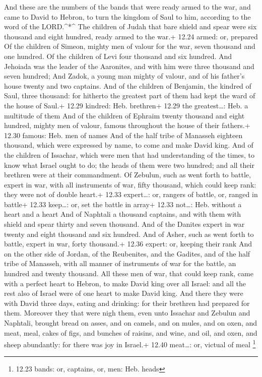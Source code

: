  And these are the numbers of the bands that were ready
armed to the war, and came to David to Hebron, to turn the kingdom of
Saul to him, according to the word of the LORD.\^{}*\^{} 
The children of Judah that bare shield and spear were six thousand and
eight hundred, ready armed to the war.+ 12.24 armed: or, prepared
 Of the children of Simeon, mighty men of valour for the
war, seven thousand and one hundred.  Of the children of
Levi four thousand and six hundred.  And Jehoiada was the
leader of the Aaronites, and with him were three thousand and seven
hundred;  And Zadok, a young man mighty of valour, and of
his father's house twenty and two captains.  And of the
children of Benjamin, the kindred of Saul, three thousand: for hitherto
the greatest part of them had kept the ward of the house of Saul.+ 12.29
kindred: Heb. brethren+ 12.29 the greatest\ldots: Heb. a multitude of
them  And of the children of Ephraim twenty thousand and
eight hundred, mighty men of valour, famous throughout the house of
their fathers.+ 12.30 famous: Heb. men of names  And of the
half tribe of Manasseh eighteen thousand, which were expressed by name,
to come and make David king.  And of the children of
Issachar, which were men that had understanding of the times, to know
what Israel ought to do; the heads of them were two hundred; and all
their brethren were at their commandment.  Of Zebulun, such
as went forth to battle, expert in war, with all instruments of war,
fifty thousand, which could keep rank: they were not of double heart.+
12.33 expert\ldots: or, rangers of battle, or, ranged in battle+ 12.33
keep\ldots: or, set the battle in array+ 12.33 not\ldots: Heb. without a
heart and a heart  And of Naphtali a thousand captains, and
with them with shield and spear thirty and seven thousand. 
And of the Danites expert in war twenty and eight thousand and six
hundred.  And of Asher, such as went forth to battle,
expert in war, forty thousand.+ 12.36 expert: or, keeping their rank
 And on the other side of Jordan, of the Reubenites, and
the Gadites, and of the half tribe of Manasseh, with all manner of
instruments of war for the battle, an hundred and twenty thousand.
 All these men of war, that could keep rank, came with a
perfect heart to Hebron, to make David king over all Israel: and all the
rest also of Israel were of one heart to make David king. 
And there they were with David three days, eating and drinking: for
their brethren had prepared for them.  Moreover they that
were nigh them, even unto Issachar and Zebulun and Naphtali, brought
bread on asses, and on camels, and on mules, and on oxen, and meat,
meal, cakes of figs, and bunches of raisins, and wine, and oil, and
oxen, and sheep abundantly: for there was joy in Israel.+ 12.40
meat\ldots: or, victual of meal \footnote{12.23 bands: or, captains, or,
  men: Heb. heads}


